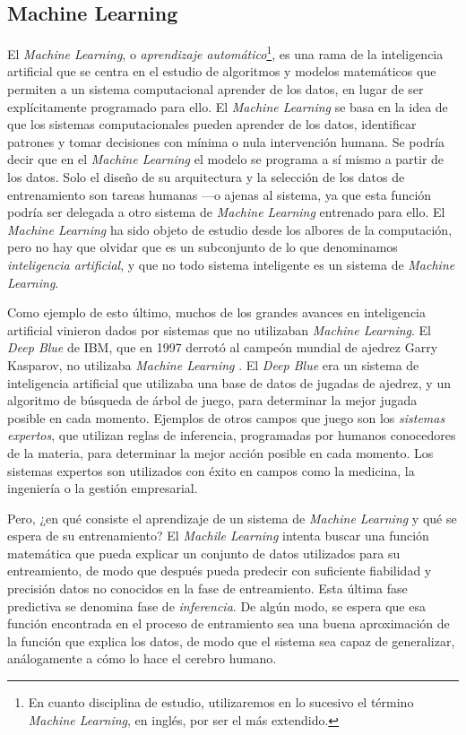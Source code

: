 \subsection{Machine Learning}

El \textit{Machine Learning}, o \textit{aprendizaje automático}\footnote{En cuanto disciplina de estudio, utilizaremos en lo sucesivo el término \textit{Machine Learning}, en inglés, por ser el más extendido.}, es una rama de la inteligencia artificial que se centra en el estudio de algoritmos y modelos matemáticos que permiten a un sistema computacional aprender de los datos, en lugar de ser explícitamente programado para ello. El \textit{Machine Learning} se basa en la idea de que los sistemas computacionales pueden aprender de los datos, identificar patrones y tomar decisiones con mínima o nula intervención humana. Se podría decir que en el \textit{Machine Learning} el modelo se programa a sí mismo a partir de los datos. Solo el diseño de su arquitectura y la selección de los datos de entrenamiento son tareas humanas ---o ajenas al sistema, ya que esta función podría ser delegada a otro sistema de \textit{Machine Learning} entrenado para ello. El \textit{Machine Learning} ha sido objeto de estudio desde los albores de la computación, pero no hay que olvidar que es un subconjunto de lo que denominamos \textit{inteligencia artificial}, y que no todo sistema inteligente es un sistema de \textit{Machine Learning}.

Como ejemplo de esto último, muchos de los grandes avances en inteligencia artificial vinieron dados por sistemas que no utilizaban \textit{Machine Learning}. El \textit{Deep Blue} de IBM, que en 1997 derrotó al campeón mundial de ajedrez Garry Kasparov, no utilizaba \textit{Machine Learning} \citep{campbellDeepBlue2002}. El \textit{Deep Blue} era un sistema de inteligencia artificial que utilizaba una base de datos de jugadas de ajedrez, y un algoritmo de búsqueda de árbol de juego, para determinar la mejor jugada posible en cada momento. Ejemplos de otros campos que juego son los \emph{sistemas expertos}, que utilizan reglas de inferencia, programadas por humanos conocedores de la materia, para determinar la mejor acción posible en cada momento. Los sistemas expertos son utilizados con éxito en campos como la medicina, la ingeniería o la gestión empresarial.

Pero, ¿en qué consiste el aprendizaje de un sistema de \textit{Machine Learning} y qué se espera de su entrenamiento? El \textit{Machile Learning} intenta buscar una función matemática que pueda explicar un conjunto de datos utilizados para su entreamiento, de modo que después pueda predecir con suficiente fiabilidad y precisión datos no conocidos en la fase de entreamiento. Esta última fase predictiva se denomina fase de \textit{inferencia}. De algún modo, se espera que esa función encontrada en el proceso de entramiento sea una buena aproximación de la función que explica los datos, de modo que el sistema sea capaz de generalizar, análogamente a cómo lo hace el cerebro humano.

